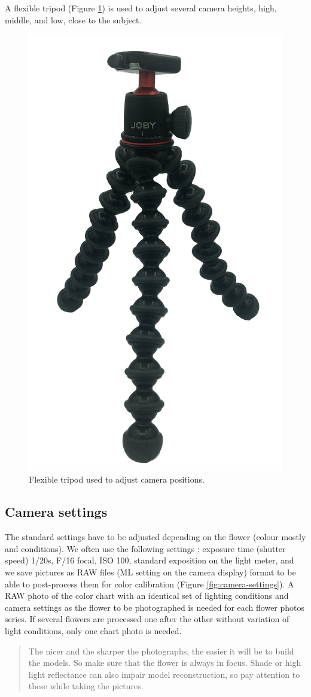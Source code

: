\documentclass[
]{book}
\begin{document}
A flexible tripod (Figure \ref{fig:tripod}) is used to adjust several camera heights, high, middle, and low, close to the subject.

\begin{figure}

{\centering \includegraphics[width=0.33\linewidth]{Figures/tripod} 

}

\caption{Flexible tripod used to adjust camera positions.}\label{fig:tripod}
\end{figure}

\hypertarget{camera-settings}{%
\subsection{Camera settings}\label{camera-settings}}

The standard settings have to be adjusted depending on the flower
(colour mostly and conditions). We often use the following settings :
exposure time (shutter speed) 1/20s, F/16 focal, ISO 100, standard
exposition on the light meter, and we save pictures as RAW files (ML
setting on the camera display) format to be able to post-process them
for color calibration (Figure \ref{fig:camera-settings}). A RAW photo of the color chart with an
identical set of lighting conditions and camera settings as the flower
to be photographed is needed for each flower photos series. If several
flowers are processed one after the other without variation of light
conditions, only one chart photo is needed.

\begin{quote}
The nicer and the sharper the photographs, the easier it will be to
build the models. So make sure that the flower is always in focus. Shade
or high light reflectance can also impair model reconstruction, so pay
attention to these while taking the pictures.
\end{quote}
\end{document}
